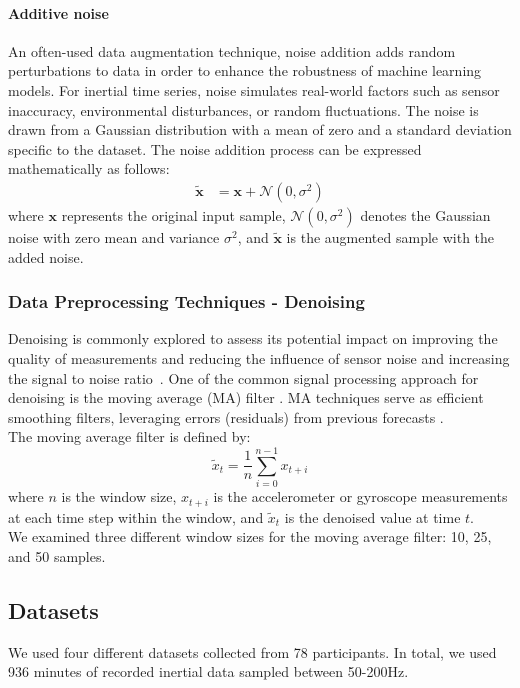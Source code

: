 \documentclass[journal]{IEEEtran}
\begin{document}
\paragraph{\textbf{Additive  noise}}
An often-used data augmentation technique, noise addition adds random perturbations to data in order to enhance the robustness of machine learning models. For inertial time series, noise simulates real-world factors such as sensor inaccuracy, environmental disturbances, or random fluctuations. The noise is drawn from a Gaussian distribution with a mean of zero and a standard deviation specific to the dataset. The noise addition process can be expressed mathematically as follows:
\begin{align}
    \tilde{\bm{x}} &= \bm{x} + \mathcal{N}(0, \sigma^2) \label{eq:aug_add_noise}
\end{align}
where \( \bm{x} \) represents the original input sample, \( \mathcal{N}(0, \sigma^2) \) denotes the Gaussian noise with zero mean and variance \( \sigma^2 \), and \( \tilde{\bm{x}} \) is the augmented sample with the added noise.
%
\subsubsection{Data Preprocessing Techniques - Denoising} 
Denoising is commonly explored to assess its potential impact on improving the quality of measurements and reducing the influence of sensor noise and increasing the signal to noise ratio~\cite {khaddour2021survey}.  One of the common signal processing approach for denoising is the moving average (MA) filter \cite{engelsman2023data}. MA techniques serve as efficient smoothing filters, leveraging errors (residuals) from previous forecasts \cite{gonzalez2018statistical}. \\
%
\noindent The moving average filter is defined by:
\begin{equation}
\tilde{x}_t = \frac{1}{n}\sum^{n-1}_{i=0} x_{t+i} \label{eq:ma_eq}
\end{equation}
where \( n \) is the window size, \( x_{t+i} \) is the accelerometer or gyroscope measurements at each time step within the window, and \(\tilde{x}_t\) is the denoised value at time \(t\).\\
%
\noindent  We examined three different window sizes for the moving average filter: 10, 25, and 50 samples.
%
%
\subsection {Datasets} \label{sec:datasets}
\noindent We used four different datasets collected from 78 participants. In total, we used 936 minutes of recorded inertial data sampled between 50-200Hz.
\end{document}
